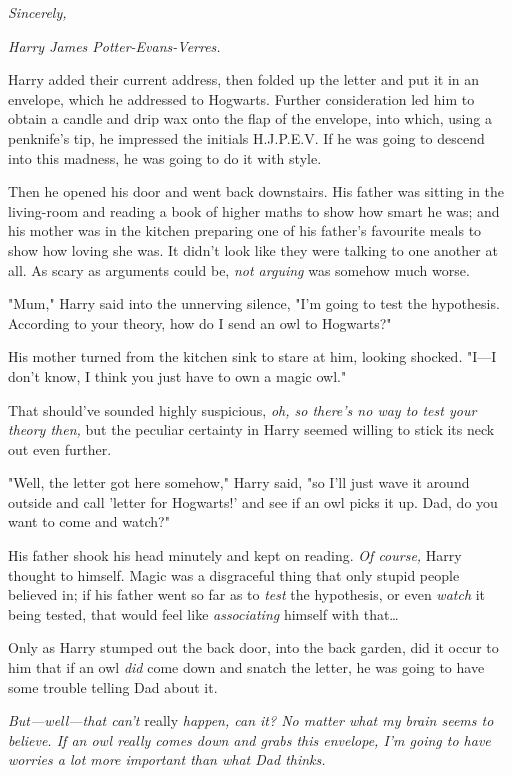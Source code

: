 \emph{Sincerely,}

\emph{Harry James Potter-Evans-Verres.}

Harry added their current address, then folded up the letter and put it in an 
envelope, which he addressed to Hogwarts. Further consideration led him to 
obtain a candle and drip wax onto the flap of the envelope, into which, using a 
penknife's tip, he impressed the initials H.J.P.E.V. If he was going to descend 
into this madness, he was going to do it with style.

Then he opened his door and went back downstairs. His father was sitting in the 
living-room and reading a book of higher maths to show how smart he was; and 
his mother was in the kitchen preparing one of his father's favourite meals to 
show how loving she was. It didn't look like they were talking to one another 
at all. As scary as arguments could be, \emph{not arguing} was somehow much 
worse.

"Mum," Harry said into the unnerving silence, "I'm going to test the 
hypothesis. According to your theory, how do I send an owl to Hogwarts?"

His mother turned from the kitchen sink to stare at him, looking shocked. 
"I---I don't know, I think you just have to own a magic owl."

That should've sounded highly suspicious, \emph{oh, so there's no way to test 
your theory then,} but the peculiar certainty in Harry seemed willing to stick 
its neck out even further.

"Well, the letter got here somehow," Harry said, "so I'll just wave it around 
outside and call 'letter for Hogwarts!' and see if an owl picks it up. Dad, do 
you want to come and watch?"

His father shook his head minutely and kept on reading. \emph{Of course,} Harry 
thought to himself. Magic was a disgraceful thing that only stupid people 
believed in; if his father went so far as to \emph{test} the hypothesis, or 
even \emph{watch} it being tested, that would feel like \emph{associating} 
himself with that{\ldots}

Only as Harry stumped out the back door, into the back garden, did it occur to 
him that if an owl \emph{did} come down and snatch the letter, he was going to 
have some trouble telling Dad about it.

\emph{But---well---that can't} really\emph{ happen, can it? No matter what my 
brain seems to believe. If an owl really comes down and grabs this envelope, 
I'm going to have worries a lot more important than what Dad thinks.}

